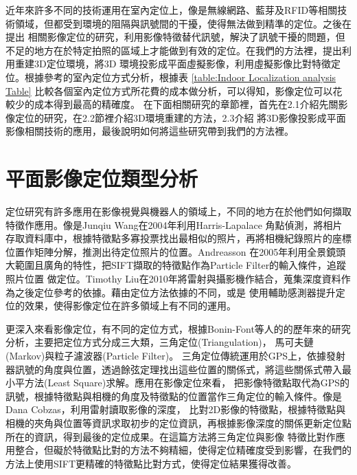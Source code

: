
	近年來許多不同的技術運用在室內定位上，像是無線網路、藍芽及RFID等相關技術領域，但都受到環境的阻隔與訊號間的干擾，使得無法做到精準的定位。之後在提出
相關影像定位的研究，利用影像特徵替代訊號，解決了訊號干擾的問題，但不足的地方在於特定拍照的區域上才能做到有效的定位。在我們的方法裡，提出利用重建3D定位環境，將3D
環境投影成平面虛擬影像，利用虛擬影像比對特徵定位。根據參考\cite{Muthukrishnan05}的室內定位方式分析，根據表 \ref{table:Indoor Localization analysis Table}
比較各個室內定位方式所花費的成本做分析，可以得知，影像定位可以花較少的成本得到最高的精確度。
在下面相關研究的章節裡，首先在2.1介紹先關影像定位的研究，在2.2節裡介紹3D環境重建的方法，2.3介紹
將3D影像投影成平面影像相關技術的應用，最後說明如何將這些研究帶到我們的方法裡。



\section{平面影像定位類型分析}
	定位研究有許多應用在影像視覺與機器人的領域上，不同的地方在於他們如何擷取特徵作應用。像是Junqiu Wang在2004年利用Harris-Lapalace	
角點偵測，將相片存取資料庫中，根據特徵點多寡投票找出最相似的照片，再將相機紀錄照片的座標位置作矩陣分解，推測出待定位照片的位置。Andreasson
在2005年\cite{Andreasson2005}利用全景鏡頭大範圍且廣角的特性，把SIFT擷取的特徵點作為Particle Filter的輸入條件，追蹤照片位置
做定位。Timothy Liu在2010年\cite{LiuT2010}將雷射與攝影機作結合，蒐集深度資料作為之後定位參考的依據。藉由定位方法依據的不同，或是
使用輔助感測器提升定位的效果，使得影像定位在許多領域上有不同的運用。

	更深入來看影像定位，有不同的定位方式，根據Bonin-Font等人的\cite{Bonin-Font2008}的歷年來的研究分析，主要把定位方式分成三大類，三角定位(Triangulation)，
馬可夫鏈(Markov)與粒子濾波器(Particle Filter)。
三角定位傳統運用於GPS上，依據發射器訊號的角度與位置，透過餘弦定理找出這些位置的關係式，將這些關係式帶入最小平方法(Least Square)求解。應用在影像定位來看，
把影像特徵點取代為GPS的訊號，根據特徵點與相機的角度及特徵點的位置當作三角定位的輸入條件。像是Dana Cobzas\cite{Cobzas2003}，利用雷射讀取影像的深度，
比對2D影像的特徵點，根據特徵點與相機的夾角與位置等資訊求取初步的定位資訊，再根據影像深度的關係更新定位點所在的資訊，得到最後的定位成果。在這篇方法將三角定位與影像
特徵比對作應用整合，但礙於特徵點比對的方法不夠精細，使得定位精確度受到影響，在我們的方法上使用SIFT更精確的特徵點比對方式，使得定位結果獲得改善。

